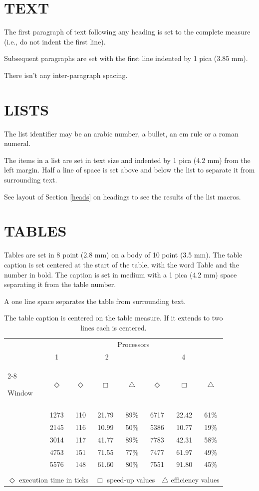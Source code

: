 \documentclass{ecai}
\begin{document}
\section{TEXT}
The first paragraph of text following any heading is set to the
complete measure (i.e., do not indent the first line).

Subsequent paragraphs are set with the first line indented
by 1 pica (3.85 mm).

There isn't any inter-paragraph spacing.

\section{LISTS}
The list identifier may be an arabic number, a bullet, an em
rule or a roman numeral.

The items in a list are set in text size and indented by 1
pica (4.2 mm) from the left margin. Half a line of space is
set above and below the list to separate it from surrounding
text.

See layout of Section \ref{heads} on headings to see the results of the list macros.

\section{TABLES}
Tables are set in 8 point (2.8 mm) on a body of 10 point (3.5 mm).
The table caption is set centered at the start of the table, with
the word Table and the number in bold. The caption is set in medium
with a 1 pica (4.2 mm) space separating it from the table number.

A one line space separates the table from surrounding text.

\begin{table}
\begin{center}
{\caption{The table caption is centered on the table measure. If it
extends to two lines each is centered.}\label{table1}}
\begin{tabular}{lccccccc}
\hline
\rule{0pt}{12pt}
&\multicolumn{7}{c}{Processors}\\
&1&\multicolumn{3}{c}{2}&\multicolumn{3}{c}{4}\\
\cline{2-8}
\rule{0pt}{12pt}
Window&$\Diamond$&$\Diamond$&$\Box$&$\bigtriangleup$&$\Diamond$&$\Box$&$\bigtriangleup$
\\
\hline
\\[-6pt]
\quad1&1273&110&21.79&89\%&6717&22.42&61\%\\
\quad2&2145&116&10.99&50\%&5386&10.77&19\%\\
\quad3&3014&117&41.77&89\%&7783&42.31&58\%\\
\quad4&4753&151&71.55&77\%&7477&61.97&49\%\\
\quad5&5576&148&61.60&80\%&7551&91.80&45\%
\\
\hline
\\[-6pt]
\multicolumn{8}{l}{$\Diamond$ execution time in ticks\ \
$\Box$ speed-up values\ \
$\bigtriangleup$ efficiency values}
\end{tabular}
\end{center}
\end{table}
\end{document}
